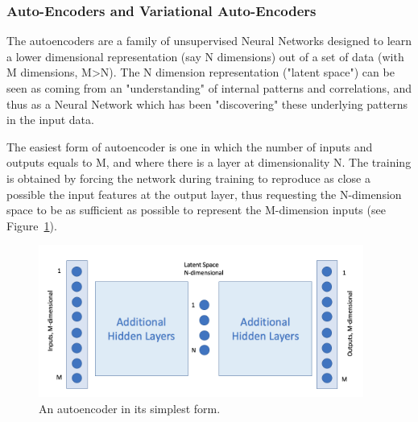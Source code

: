 
\subsubsection{Auto-Encoders and Variational Auto-Encoders}
\label{sec:unsupervised}
The autoencoders are a family of unsupervised Neural Networks designed to learn a lower dimensional representation (say N dimensions) out of a set of data (with M dimensions, M\textgreater N). The N dimension representation ("latent space") can be seen as coming from an "understanding" of internal patterns and correlations, and thus as a Neural Network which has been "discovering" these underlying patterns in the input data.

The easiest form of autoencoder is one in which the number of inputs and outputs equals to M, and where there is a layer at dimensionality N. The training is obtained by forcing the network during training to reproduce as close a possible the input features at the output layer, thus requesting the N-dimension space to be as sufficient as possible to represent the M-dimension inputs (see Figure~\ref{fig:autoencoder}).

\begin{figure}[h]
     \centering
     \includegraphics[width=0.95\textwidth]{images/autoencoder.png}
     \caption{An autoencoder in its simplest form.}
     \label{fig:autoencoder}
 \end{figure}
 
